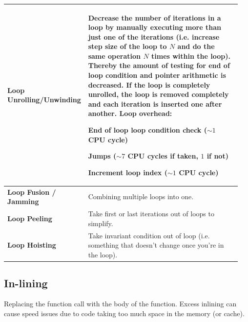 		\begin{longtable}{|>{\bfseries}p{0.3\linewidth}|p{0.65\linewidth}|}
				\hline	
					Loop Unrolling/Unwinding
				& Decrease the number of iterations in a loop by manually executing more than just one of the iterations (i.e. increase step size of the loop to $N$ and do the same operation $N$ times within the loop). Thereby the amount of testing for end of loop condition and pointer arithmetic is decreased. If the loop is completely unrolled, the loop is removed completely and each iteration is inserted one after another.\newline
				\textbf{Loop overhead:}
				\begin{compactitem}
					\item End of loop loop condition check ($\sim 1$ CPU cycle)
					\item Jumps ($\sim 7$ CPU cycles if taken, $1$ if not)
					\item Increment loop index ($\sim 1$ CPU cycle)
				\end{compactitem} \\[-\normalbaselineskip]
				\hline				
				Loop Fusion / Jamming
					& Combining multiple loops into one.\\
				\hline
				Loop Peeling
					& Take first or last iterations out of loops to simplify.\\
				\hline		
				Loop Hoisting
				& Take invariant condition out of loop (i.e. something that doesn't change once you're in the loop).\\
				\hline
		\end{longtable}		
		
	\subsection{In-lining}
		Replacing the function call with the body of the function. Excess inlining can cause speed issues due to code taking too much space in the memory (or cache).